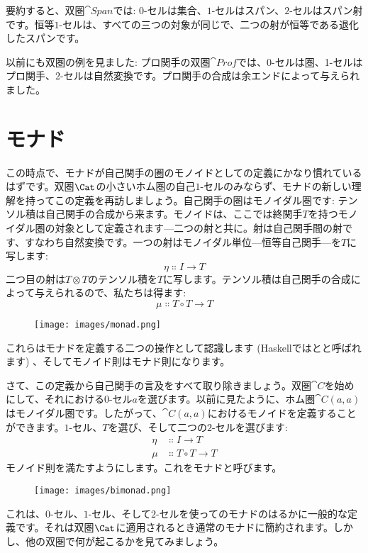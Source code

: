 \noindent
要約すると、双圏$\cat{Span}$では: $0$-セルは集合、$1$-セルはスパン、$2$-セルはスパン射です。恒等$1$-セルは、すべての三つの対象が同じで、二つの射が恒等である退化したスパンです。

以前にも双圏の例を見ました: プロ関手の双圏$\cat{Prof}$では、0-セルは圏、1-セルはプロ関手、2-セルは自然変換です。プロ関手の合成は余エンドによって与えられました。

\section{モナド}

この時点で、モナドが自己関手の圏のモノイドとしての定義にかなり慣れているはずです。双圏$\Cat$の小さいホム圏の自己$1$-セルのみならず、モナドの新しい理解を持ってこの定義を再訪しましょう。自己関手の圏はモノイダル圏です: テンソル積は自己関手の合成から来ます。モノイドは、ここでは終関手$T$を持つモノイダル圏の対象として定義されます—二つの射と共に。射は自己関手間の射です、すなわち自然変換です。一つの射はモノイダル単位—恒等自己関手—を$T$に写します: 
\[\eta \Colon I \to T\]
二つ目の射は$T \otimes T$のテンソル積を$T$に写します。テンソル積は自己関手の合成によって与えられるので、私たちは得ます: 
\[\mu \Colon T \circ T \to T\]

\begin{figure}[H]
  \centering
  \texttt{[image: images/monad.png]}
\end{figure}

\noindent
これらはモナドを定義する二つの操作として認識します (Haskellではとと呼ばれます) 、そしてモノイド則はモナド則になります。

さて、この定義から自己関手の言及をすべて取り除きましょう。双圏$\cat{C}$を始めにして、それにおける$0$-セル$a$を選びます。以前に見たように、ホム圏$\cat{C}(a, a)$はモノイダル圏です。したがって、$\cat{C}(a, a)$におけるモノイドを定義することができます。$1$-セル、$T$を選び、そして二つの$2$-セルを選びます: 
\begin{align*}
  \eta & \Colon I \to T         \\
  \mu  & \Colon T \circ T \to T
\end{align*}
モノイド則を満たすようにします。これをモナドと呼びます。

\begin{figure}[H]
  \centering
  \texttt{[image: images/bimonad.png]}
\end{figure}

\noindent
これは、$0$-セル、$1$-セル、そして$2$-セルを使ってのモナドのはるかに一般的な定義です。それは双圏$\Cat$に適用されるとき通常のモナドに簡約されます。しかし、他の双圏で何が起こるかを見てみましょう。

